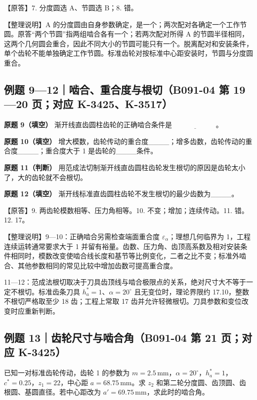 \documentclass[zihao=5,a4paper,UTF8,fontset=fandol]{ctexart}
\begin{document}
【原答】7. 分度圆选 A、节圆选 B；8. 错。


【整理说明】A 的分度圆由自身参数确定，是一个；两次配对各确定一个工作节圆。原答“两个节圆”指两组啮合各有一个；若两次配对所得 A 的节圆半径相同，这两个几何圆会重合，因此不同大小的节圆可能只有一个。脱离配对和安装条件，单个齿轮不能单独确定工作节圆。标准齿轮对按标准中心距安装时，节圆与分度圆重合。


\subsection{例题 9—12｜啮合、重合度与根切（B091-04 第 19—20 页；对应 K-3425、K-3517）}

\textbf{原题 9（填空）} 渐开线直齿圆柱齿轮的正确啮合条件是 $\underline{\qquad\qquad\qquad}$。


\textbf{原题 10（填空）} 增大模数，齿轮传动的重合度\_\_\_\_；增多齿数，齿轮传动的重合度\_\_\_\_；重合度大于 1 是齿轮的\_\_\_\_条件。


\textbf{原题 11（判断）} 用范成法切制渐开线直齿圆柱齿轮发生根切的原因是齿轮太小了，大的齿轮就不会根切。


\textbf{原题 12（填空）} 渐开线标准直齿圆柱齿轮不发生根切的最少齿数为\_\_\_\_。


【原答】9. 两齿轮模数相等、压力角相等。10. 不变；增加；连续传动。11. 错。12. 17。


【整理说明】9—10：正确啮合另需检查端面重合度 $\varepsilon_\alpha$；理想几何临界为 1，工程连续运转通常要求大于 1 并留有裕量。齿数、压力角、齿顶高系数及相对安装条件相同时，模数改变使啮合线长度和基节等比例变化，二者之比不变；标准外啮合、其他参数相同的常见比较中增加齿数可提高重合度。


11—12：范成法根切取决于刀具齿顶线与啮合极限点的关系，绝对尺寸大不等于一定不根切。标准齿条刀具 $h_a^*=1$、$\alpha=20^\circ$ 且无变位时，理论界限约 17.10，整数不根切严格取至少 18 齿；工程上常取 17 齿并允许轻微根切。刀具参数和变位改变时应重新判断。




\subsection{例题 13｜齿轮尺寸与啮合角（B091-04 第 21 页；对应 K-3425）}

已知一对标准齿轮传动，齿轮 1 的参数为 $m=2.5\,\mathrm{mm}$，$\alpha=20^\circ$，$h_a^*=1$，$c^*=0.25$，$z_1=22$，中心距 $a=68.75\,\mathrm{mm}$。求 $z_2$ 和第二轮分度圆、齿顶圆、齿根圆、基圆直径。若中心距改为 $a'=69.75\,\mathrm{mm}$，求此时的啮合角。
\end{document}
